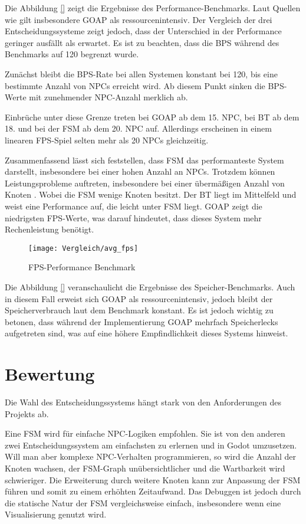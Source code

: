 Die Abbildung \ref{} zeigt die Ergebnisse des Performance-Benchmarks. Laut Quellen wie \autocite{} gilt insbesondere GOAP als ressourcenintensiv. Der Vergleich der drei Entscheidungssysteme zeigt jedoch, dass der Unterschied in der Performance geringer ausf\"{a}llt als erwartet. Es ist zu beachten, dass die BPS w\"{a}hrend des Benchmarks auf 120 begrenzt wurde. 

Zun\"{a}chst bleibt die BPS-Rate bei allen Systemen konstant bei 120, bis eine bestimmte Anzahl von NPCs erreicht wird. Ab diesem Punkt sinken die BPS-Werte mit zunehmender NPC-Anzahl merklich ab.

Einbr\"{u}che unter diese Grenze treten bei GOAP ab dem 15. NPC, bei BT ab dem 18. und bei der FSM ab dem 20. NPC auf. Allerdings erscheinen in einem linearen FPS-Spiel selten mehr als 20 NPCs gleichzeitig. 

Zusammenfassend l\"{a}sst sich feststellen, dass FSM das performanteste System darstellt, insbesondere bei einer hohen Anzahl an NPCs. Trotzdem k\"{o}nnen Leistungsprobleme auftreten, insbesondere bei einer \"{u}berm\"{a}\ss{}igen Anzahl von Knoten \autocite{U2023}. Wobei die FSM wenige Knoten besitzt. Der BT liegt im Mittelfeld und weist eine Performance auf, die leicht unter FSM liegt. GOAP zeigt die niedrigsten FPS-Werte, was darauf hindeutet, dass dieses System mehr Rechenleistung ben\"{o}tigt.

\begin{figure}[h]
  \centering
  \texttt{[image: Vergleich/avg\_fps]}
	\captionsetup{justification=justified, format=plain}
  \caption{FPS-Performance Benchmark}
  \label{FPS-Performance Benchmark}
\end{figure}

Die Abbildung \ref{} veranschaulicht die Ergebnisse des Speicher-Benchmarks. Auch in diesem Fall erweist sich GOAP als ressourcenintensiv, jedoch bleibt der Speicherverbrauch laut dem Benchmark konstant. Es ist jedoch wichtig zu betonen, dass w\"{a}hrend der Implementierung GOAP mehrfach Speicherlecks aufgetreten sind, was auf eine h\"{o}here Empfindlichkeit dieses Systems hinweist.


\section{Bewertung}
\label{chap:bewertung}

Die Wahl des Entscheidungssystems h\"{a}ngt stark von den Anforderungen des Projekts ab.

Eine FSM wird f\"{u}r einfache NPC-Logiken empfohlen. Sie ist von den anderen zwei Entscheidungssystem am einfachsten zu erlernen und in Godot umzusetzen. Will man aber komplexe NPC-Verhalten programmieren, so wird die Anzahl der Knoten wachsen, der FSM-Graph un\"{u}bersichtlicher und die Wartbarkeit wird schwieriger. Die Erweiterung durch weitere Knoten kann zur Anpassung der FSM f\"{u}hren und somit zu einem erh\"{o}hten Zeitaufwand. Das Debuggen ist jedoch durch die statische Natur der FSM vergleichsweise einfach, insbesondere wenn eine Visualisierung genutzt wird.

